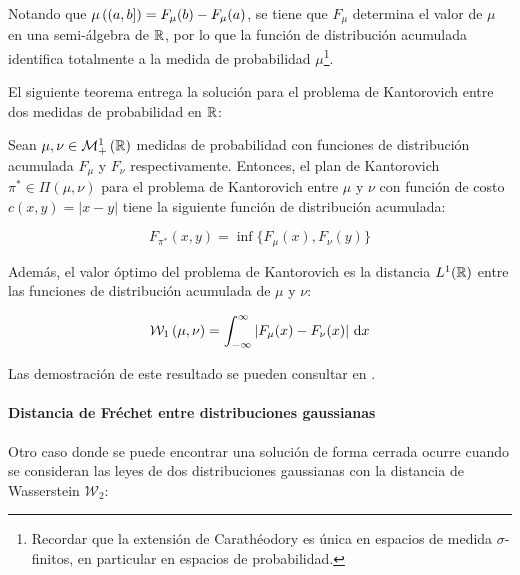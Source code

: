 Notando que $\mu\left((a, b]\right) = F_\mu(b) - F_\mu(a)$, se tiene que $F_\mu$ determina el valor de $\mu$ en una semi-álgebra de $\mathbb{R}$, por lo que la función de distribución acumulada identifica totalmente a la medida de probabilidad $\mu$\footnote{Recordar que la extensión de Carathéodory es única en espacios de medida $\sigma$-finitos, en particular en espacios de probabilidad.}.

El siguiente teorema entrega la solución para el problema de Kantorovich entre dos medidas de probabilidad en $\mathbb{R}$:

\begin{teo}
	\label{teo:kantorovich_r}
	Sean $\mu,\nu\in\mathcal{M}_+^1\left(\mathbb{R}\right)$ medidas de probabilidad con funciones de distribución acumulada $F_\mu$ y $F_\nu$ respectivamente. Entonces, el plan de Kantorovich $\pi^*\in\Pi(\mu,\nu)$ para el problema de Kantorovich entre $\mu$ y $\nu$ con función de costo $c(x,y)=|x-y|$ tiene la siguiente función de distribución acumulada:

	\begin{equation}
		F_{\pi^*}(x,y) = \inf \{F_\mu(x),F_\nu(y)\}
	\end{equation}

	Además, el valor óptimo del problema de Kantorovich es la distancia $L^1(\mathbb{R})$ entre las funciones de distribución acumulada de $\mu$ y $\nu$:

	\begin{equation}
		\mathcal{W}_{1}\left(\mu,\nu\right) =
		\int_{-\infty}^\infty \left|F_\mu(x)-F_\nu(x)\right| \,\operatorname{d}\! x
	\end{equation}
\end{teo}

Las demostración de este resultado se pueden consultar en \cite{Thorpe2018}.

\paragraph{Distancia de Fréchet entre distribuciones gaussianas}

Otro caso donde se puede encontrar una solución de forma cerrada ocurre cuando se consideran las leyes de dos distribuciones gaussianas con la distancia de Wasserstein $\mathcal{W}_2$:

